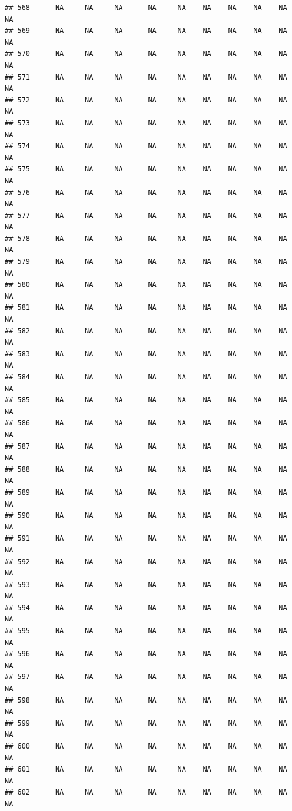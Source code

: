 \documentclass{article}\usepackage{graphicx, color}
\makeatletter
\newenvironment{kframe}{%
 \def\at@end@of@kframe{}%
 \ifinner\ifhmode%
  \def\at@end@of@kframe{\end{minipage}}%
  \begin{minipage}{\columnwidth}%
 \fi\fi%
 \def\FrameCommand##1{\hskip\@totalleftmargin \hskip-\fboxsep
 \colorbox{shadecolor}{##1}\hskip-\fboxsep
     \hskip-\linewidth \hskip-\@totalleftmargin \hskip\columnwidth}%
 \MakeFramed {\advance\hsize-\width
   \@totalleftmargin\z@ \linewidth\hsize
   \@setminipage}}%
 {\par\unskip\endMakeFramed%
 \at@end@of@kframe}
\newenvironment{knitrout}{}{} %
\makeatother
\begin{document}
\begin{knitrout}
\begin{kframe}
\begin{verbatim}
## 568      NA     NA     NA      NA     NA    NA    NA    NA    NA     NA
## 569      NA     NA     NA      NA     NA    NA    NA    NA    NA     NA
## 570      NA     NA     NA      NA     NA    NA    NA    NA    NA     NA
## 571      NA     NA     NA      NA     NA    NA    NA    NA    NA     NA
## 572      NA     NA     NA      NA     NA    NA    NA    NA    NA     NA
## 573      NA     NA     NA      NA     NA    NA    NA    NA    NA     NA
## 574      NA     NA     NA      NA     NA    NA    NA    NA    NA     NA
## 575      NA     NA     NA      NA     NA    NA    NA    NA    NA     NA
## 576      NA     NA     NA      NA     NA    NA    NA    NA    NA     NA
## 577      NA     NA     NA      NA     NA    NA    NA    NA    NA     NA
## 578      NA     NA     NA      NA     NA    NA    NA    NA    NA     NA
## 579      NA     NA     NA      NA     NA    NA    NA    NA    NA     NA
## 580      NA     NA     NA      NA     NA    NA    NA    NA    NA     NA
## 581      NA     NA     NA      NA     NA    NA    NA    NA    NA     NA
## 582      NA     NA     NA      NA     NA    NA    NA    NA    NA     NA
## 583      NA     NA     NA      NA     NA    NA    NA    NA    NA     NA
## 584      NA     NA     NA      NA     NA    NA    NA    NA    NA     NA
## 585      NA     NA     NA      NA     NA    NA    NA    NA    NA     NA
## 586      NA     NA     NA      NA     NA    NA    NA    NA    NA     NA
## 587      NA     NA     NA      NA     NA    NA    NA    NA    NA     NA
## 588      NA     NA     NA      NA     NA    NA    NA    NA    NA     NA
## 589      NA     NA     NA      NA     NA    NA    NA    NA    NA     NA
## 590      NA     NA     NA      NA     NA    NA    NA    NA    NA     NA
## 591      NA     NA     NA      NA     NA    NA    NA    NA    NA     NA
## 592      NA     NA     NA      NA     NA    NA    NA    NA    NA     NA
## 593      NA     NA     NA      NA     NA    NA    NA    NA    NA     NA
## 594      NA     NA     NA      NA     NA    NA    NA    NA    NA     NA
## 595      NA     NA     NA      NA     NA    NA    NA    NA    NA     NA
## 596      NA     NA     NA      NA     NA    NA    NA    NA    NA     NA
## 597      NA     NA     NA      NA     NA    NA    NA    NA    NA     NA
## 598      NA     NA     NA      NA     NA    NA    NA    NA    NA     NA
## 599      NA     NA     NA      NA     NA    NA    NA    NA    NA     NA
## 600      NA     NA     NA      NA     NA    NA    NA    NA    NA     NA
## 601      NA     NA     NA      NA     NA    NA    NA    NA    NA     NA
## 602      NA     NA     NA      NA     NA    NA    NA    NA    NA     NA

\end{verbatim}
\end{kframe}
\end{knitrout}
\end{document}
